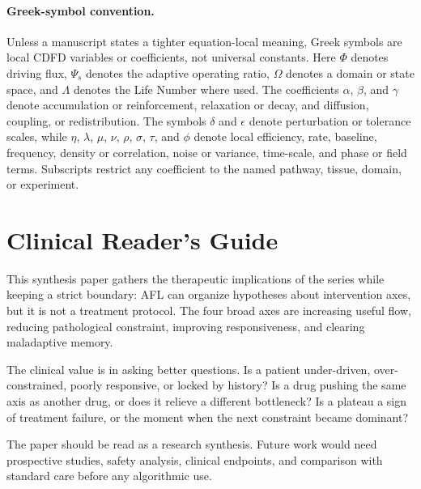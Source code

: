 \documentclass[12pt,a4paper]{article}
\begin{document}
\paragraph{Greek-symbol convention.}
Unless a manuscript states a tighter equation-local meaning, Greek symbols are local CDFD variables or coefficients, not universal constants. Here $\Phi$ denotes driving flux, $\Psi_s$ denotes the adaptive operating ratio, $\Omega$ denotes a domain or state space, and $\Lambda$ denotes the Life Number where used. The coefficients $\alpha$, $\beta$, and $\gamma$ denote accumulation or reinforcement, relaxation or decay, and diffusion, coupling, or redistribution. The symbols $\delta$ and $\epsilon$ denote perturbation or tolerance scales, while $\eta$, $\lambda$, $\mu$, $\nu$, $\rho$, $\sigma$, $\tau$, and $\phi$ denote local efficiency, rate, baseline, frequency, density or correlation, noise or variance, time-scale, and phase or field terms. Subscripts restrict any coefficient to the named pathway, tissue, domain, or experiment.

\section*{Clinical Reader's Guide}
This synthesis paper gathers the therapeutic implications of the series while keeping a strict boundary: AFL can organize hypotheses about intervention axes, but it is not a treatment protocol. The four broad axes are increasing useful flow, reducing pathological constraint, improving responsiveness, and clearing maladaptive memory.

The clinical value is in asking better questions. Is a patient under-driven, over-constrained, poorly responsive, or locked by history? Is a drug pushing the same axis as another drug, or does it relieve a different bottleneck? Is a plateau a sign of treatment failure, or the moment when the next constraint became dominant?

The paper should be read as a research synthesis. Future work would need prospective studies, safety analysis, clinical endpoints, and comparison with standard care before any algorithmic use.


\vspace{0.5em}\noindent{}
\vspace{0.75em}
\end{document}
